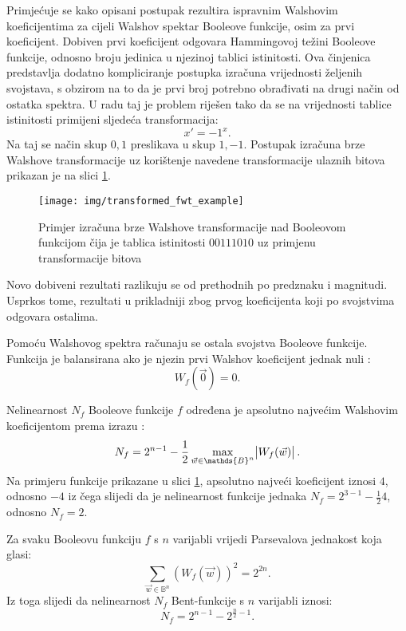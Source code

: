Primjećuje se kako opisani postupak rezultira ispravnim Walshovim koeficijentima za cijeli Walshov spektar Booleove funkcije, osim za prvi koeficijent.
Dobiven prvi koeficijent odgovara Hammingovoj težini Booleove funkcije, odnosno broju jedinica u njezinoj tablici istinitosti.
Ova činjenica predstavlja dodatno kompliciranje postupka izračuna vrijednosti željenih svojstava, s obzirom na to da je prvi broj potrebno obrađivati na drugi način od ostatka spektra.
U radu \cite{MeasuringBoolean} taj je problem riješen tako da se na vrijednosti tablice istinitosti primijeni sljedeća transformacija:
\begin{equation}
    x' = -1^x.
\end{equation}
Na taj se način skup ${0, 1}$ preslikava u skup ${1, -1}$.
Postupak izračuna brze Walshove transformacije uz korištenje navedene transformacije ulaznih bitova prikazan je na slici \ref{fig:transformed_fwt_example}.
\begin{figure}[ht!] 
    \centering
    \texttt{[image: img/transformed\_fwt\_example]}
    \captionsetup{justification=centering}
    \caption{Primjer izračuna brze Walshove transformacije nad Booleovom funkcijom čija je tablica istinitosti $00111010$ uz primjenu transformacije bitova}
    \label{fig:transformed_fwt_example}
\end{figure}
Novo dobiveni rezultati razlikuju se od prethodnih po predznaku i magnitudi.
Usprkos tome, rezultati u prikladniji zbog prvog koeficijenta koji po svojstvima odgovara ostalima.

Pomoću Walshovog spektra računaju se ostala svojstva Booleove funkcije.
Funkcija je balansirana ako je njezin prvi Walshov koeficijent jednak nuli \cite{MaximalNonlinearity}:
\begin{equation}
    W_f(\vec{0}) = 0.
\end{equation} 

Nelinearnost $N_f$ Booleove funkcije $f$ određena je apsolutno najvećim Walshovim koeficijentom prema izrazu \cite{MaximalNonlinearity}:
\begin{equation}
    N_f = 2^{n-1} - \frac{1}{2}\max_{\vec{w} \in \mathds{B}^n} \abs{W_f(\vec{w})}.
\end{equation}
Na primjeru funkcije prikazane u slici \ref{fig:transformed_fwt_example}, apsolutno najveći koeficijent iznosi $4$, odnosno $-4$ iz čega slijedi da je nelinearnost funkcije jednaka $N_f = 2^{3-1} - \frac{1}{2}4$, odnosno $N_f = 2$.

Za svaku Booleovu funkciju $f$ s $n$ varijabli vrijedi Parsevalova jednakost koja glasi:
\begin{equation}
    \sum_{\vec{w}\in \mathds{B}^n} \left( W_f(\vec{w}) \right)^2 = 2^{2n}.
\end{equation} 
Iz toga slijedi da nelinearnost $N_f$ Bent-funkcije s $n$ varijabli iznosi:
\begin{equation}
    N_f = 2^{n-1} - 2^{\frac{n}{2}-1}.
\end{equation}
